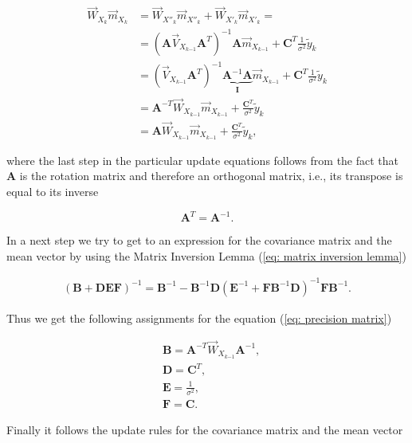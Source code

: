 \documentclass[11pt,a4paper,twoside]{report}
\newcommand{\messF}[3]{\overrightarrow{#1}_{{#2}_{k{#3}}}}
\newcommand{\mat}[1]{\mathbf{#1}}
\begin{document}
\begin{align}
  \label{eq: weighted mean}
  \messF{W}{X}{}\messF{m}{X}{} &= \messF{W}{X''}{}\messF{m}{X''}{} + \messF{W}{X'}{}\messF{m}{X'}{} = \\
  &= \left(\mat{A}\messF{V}{X}{-1}\mat{A}^T\right)^{-1}\mat{A}\messF{m}{X}{-1} + \mat{C}^T\frac{1}{\sigma^2}\tilde{y}_k \\
  &= \left(\messF{V}{X}{-1}\mat{A}^T\right)^{-1}\underbrace{\mat{A}^{-1}\mat{A}}_{\mat{I}}\messF{m}{X}{-1} + \mat{C}^T\frac{1}{\sigma^2}\tilde{y}_k \\
  &= \mat{A}^{-T}\messF{W}{X}{-1}\messF{m}{X}{-1} + \frac{\mat{C}^T}{\sigma^2}\tilde{y}_k \\
  &= \mat{A}\messF{W}{X}{-1}\messF{m}{X}{-1} + \frac{\mat{C}^T}{\sigma^2}\tilde{y}_k,
\end{align}

where the last step in the particular update equations follows from the fact that $\mat{A}$ is the rotation matrix and therefore an orthogonal matrix, i.e., its transpose is equal to its inverse

\begin{equation*}
	\mat{A}^T = \mat{A}^{-1}.
\end{equation*}

In a next step we try to get to an expression for the covariance matrix and the mean vector by using the Matrix Inversion Lemma (\ref{eq: matrix inversion lemma})
 
\begin{align}
	\label{eq: matrix inversion lemma}
	\left(\mat{B} + \mat{DEF}\right)^{-1} = \mat{B}^{-1} - \mat{B}^{-1}\mat{D}\left(\mat{E}^{-1} + \mat{F}\mat{B}^{-1}\mat{D}\right)^{-1}\mat{F}\mat{B}^{-1}.
\end{align}

Thus we get the following assignments for the equation (\ref{eq: precision matrix})

\begin{align}
	\label{eq: assignments MIL}
	& \mat{B} = \mat{A}^{-T}\messF{W}{X}{-1}\mat{A}^{-1}, \\
	& \mat{D} = \mat{C}^T, \\
	& \mat{E} = \frac{1}{\sigma^2}, \\
	& \mat{F} = \mat{C}.
\end{align}

Finally it follows the update rules for the covariance matrix and the mean vector
\end{document}
